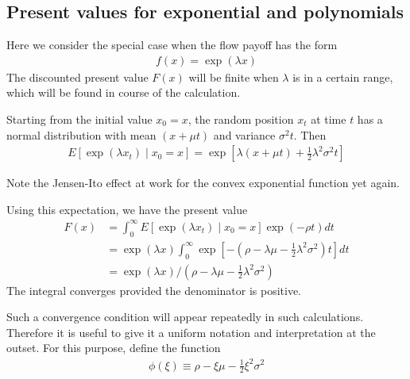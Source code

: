 \documentclass[12pt]{article}
\theoremstyle{definition}
\begin{document}
\subsection{Present values for exponential and polynomials}
Here we consider the special case when the flow payoff has the form
\begin{align*}
f(x)=\exp (\lambda x)
\end{align*}
The discounted present value $F(x)$ will be finite when $\lambda$ is in a certain range, which will be found in course of the calculation.

Starting from the initial value $x_{0}=x$, the random position $x_{t}$ at time $t$ has a normal distribution with mean $(x+\mu t)$ and variance $\sigma^{2} t$. Then
\begin{align*}
E\left[\exp \left(\lambda x_{t}\right) \mid x_{0}=x\right]=\exp \left[\lambda(x+\mu t)+\frac{1}{2} \lambda^{2} \sigma^{2} t\right]
\end{align*}

Note the Jensen-Ito effect at work for the convex exponential function yet again.

Using this expectation, we have the present value
\begin{align}
F(x) & =\int_{0}^{\infty} E\left[\exp \left(\lambda x_{t}\right) \mid x_{0}=x\right] \exp (-\rho t) d t \\
& =\exp (\lambda x) \int_{0}^{\infty} \exp \left[-\left(\rho-\lambda \mu-\frac{1}{2} \lambda^{2} \sigma^{2}\right) t\right] d t \\
& =\exp (\lambda x) /\left(\rho-\lambda \mu-\frac{1}{2} \lambda^{2} \sigma^{2}\right)
\label{2.3}
\end{align}
The integral converges provided the denominator is positive.

Such a convergence condition will appear repeatedly in such calculations. Therefore it is useful to give it a uniform notation and interpretation at the outset. For this purpose, define the function
\begin{align}
\phi(\xi) \equiv \rho-\xi \mu-\frac{1}{2} \xi^{2} \sigma^{2} \label{2.4}
\end{align}
\end{document}
